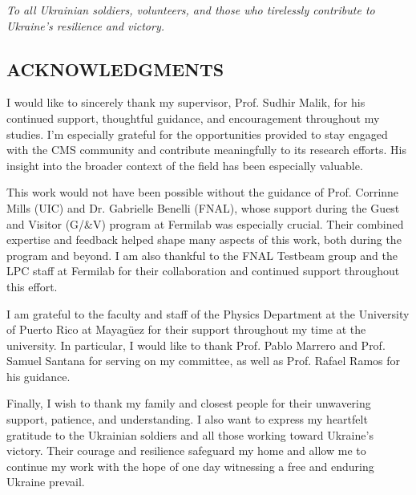 


\vspace*{2in}
\begin{center}
	\emph{To all Ukrainian soldiers, volunteers, and those who tirelessly contribute to Ukraine’s resilience and victory.}
\end{center}

\newpage


\vspace*{0.5in}
\begin{center}
	\section*{ACKNOWLEDGMENTS}
\end{center}


\noindent

I would like to sincerely thank my supervisor, Prof. Sudhir Malik, for his continued support, thoughtful guidance, and encouragement throughout my studies. I’m especially grateful for the opportunities provided to stay engaged with the CMS community and contribute meaningfully to its research efforts. His insight into the broader context of the field has been especially valuable.

This work would not have been possible without the guidance of Prof. Corrinne Mills (UIC) and Dr. Gabrielle Benelli (FNAL), whose support during the Guest and Visitor (G/&V) program at Fermilab was especially crucial. Their combined expertise and feedback helped shape many aspects of this work, both during the program and beyond. I am also thankful to the FNAL Testbeam group and the LPC staff at Fermilab for their collaboration and continued support throughout this effort.

I am grateful to the faculty and staff of the Physics Department at the University of Puerto Rico at Mayagüez for their support throughout my time at the university. In particular, I would like to thank Prof. Pablo Marrero and Prof. Samuel Santana for serving on my committee, as well as Prof. Rafael Ramos for his guidance.

Finally, I wish to thank my family and closest people for their unwavering support, patience, and understanding. I also want to express my heartfelt gratitude to the Ukrainian soldiers and all those working toward Ukraine’s victory. Their courage and resilience safeguard my home and allow me to continue my work with the hope of one day witnessing a free and enduring Ukraine prevail.
